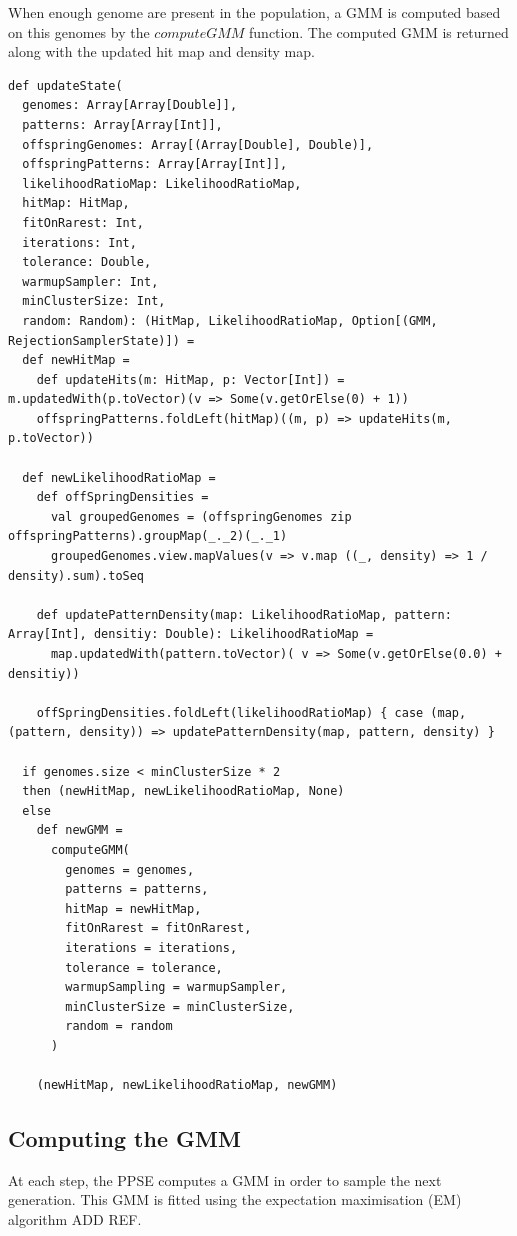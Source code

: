 \documentclass[10pt,letterpaper]{article}
\theoremstyle{definition}
\theoremstyle{remark}
\begin{document}
When enough genome are present in the population, a GMM is computed based on this genomes by the $computeGMM$ function. The computed GMM is returned along with the updated hit map and density map.

\begin{lstlisting}[caption={Update State},label={lst:updateState}]
def updateState(
  genomes: Array[Array[Double]],
  patterns: Array[Array[Int]],
  offspringGenomes: Array[(Array[Double], Double)],
  offspringPatterns: Array[Array[Int]],
  likelihoodRatioMap: LikelihoodRatioMap,
  hitMap: HitMap,
  fitOnRarest: Int,
  iterations: Int,
  tolerance: Double,
  warmupSampler: Int,
  minClusterSize: Int,
  random: Random): (HitMap, LikelihoodRatioMap, Option[(GMM, RejectionSamplerState)]) =
  def newHitMap =
    def updateHits(m: HitMap, p: Vector[Int]) = m.updatedWith(p.toVector)(v => Some(v.getOrElse(0) + 1))
    offspringPatterns.foldLeft(hitMap)((m, p) => updateHits(m, p.toVector))

  def newLikelihoodRatioMap =
    def offSpringDensities =
      val groupedGenomes = (offspringGenomes zip offspringPatterns).groupMap(_._2)(_._1)
      groupedGenomes.view.mapValues(v => v.map ((_, density) => 1 / density).sum).toSeq

    def updatePatternDensity(map: LikelihoodRatioMap, pattern: Array[Int], densitiy: Double): LikelihoodRatioMap =
      map.updatedWith(pattern.toVector)( v => Some(v.getOrElse(0.0) + densitiy))

    offSpringDensities.foldLeft(likelihoodRatioMap) { case (map, (pattern, density)) => updatePatternDensity(map, pattern, density) }

  if genomes.size < minClusterSize * 2
  then (newHitMap, newLikelihoodRatioMap, None)
  else
    def newGMM =
      computeGMM(
        genomes = genomes,
        patterns = patterns,
        hitMap = newHitMap,
        fitOnRarest = fitOnRarest,
        iterations = iterations,
        tolerance = tolerance,
        warmupSampling = warmupSampler,
        minClusterSize = minClusterSize,
        random = random
      )

    (newHitMap, newLikelihoodRatioMap, newGMM)
\end{lstlisting}


\subsection*{Computing the GMM}\label{sec:computeGMM}

At each step, the PPSE computes a GMM in order to sample the next generation. This GMM is fitted using the expectation maximisation (EM) algorithm {\color{red} ADD REF}. 
\end{document}
